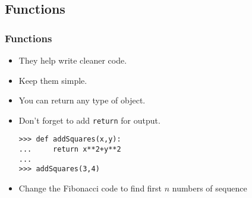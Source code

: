 \documentclass[xcolor=x11names,compress]{beamer}
\renewcommand{\(}{\begin{columns}}
\renewcommand{\)}{\end{columns}}
\newcommand{\<}[1]{\begin{column}{#1}}
\renewcommand{\>}{\end{column}}
\begin{document}
\subsection{Functions}
\begin{frame}[fragile]
  \frametitle{Functions}
  \begin{itemize} 
  	\item They help write cleaner code. \pause
	\item Keep them simple. \pause
	\item You can return any type of object. \pause
	\item Don't forget to add \texttt{return} for output. \pause
\begin{verbatim}
>>> def addSquares(x,y):
...     return x**2+y**2
...
>>> addSquares(3,4)
\end{verbatim}
\pause
\item Change the Fibonacci code to find first $n$ numbers of sequence
  \end{itemize}
\end{frame}
\end{document}
